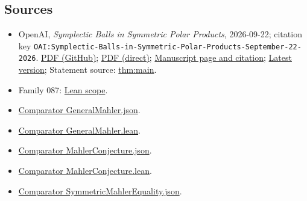 \documentclass[11pt]{article}
\begin{document}
\subsection{Sources}
\begin{itemize}
\item OpenAI, \emph{Symplectic Balls in Symmetric Polar Products}, 2026-09-22; citation key \texttt{OAI:Symplectic-Balls-in-Symmetric-Polar-Products-September-22-2026}. \href{https://github.com/openai/math/blob/adc7f1241b42e322a6451854ab7e4b4c146bf78a/preprints/Symplectic-Balls-in-Symmetric-Polar-Products-September-22-2026/paper.pdf}{PDF (GitHub)}; \href{https://github.com/openai/math/raw/adc7f1241b42e322a6451854ab7e4b4c146bf78a/preprints/Symplectic-Balls-in-Symmetric-Polar-Products-September-22-2026/paper.pdf}{PDF (direct)}; \href{https://github.com/openai/math/blob/adc7f1241b42e322a6451854ab7e4b4c146bf78a/preprints/Symplectic-Balls-in-Symmetric-Polar-Products-September-22-2026/README.md}{Manuscript page and citation}; \href{https://github.com/openai/math/blob/main/preprints/Symplectic-Balls-in-Symmetric-Polar-Products-September-22-2026/paper.pdf}{Latest version}; Statement source: \href{https://github.com/openai/math/blob/adc7f1241b42e322a6451854ab7e4b4c146bf78a/preprints/Symplectic-Balls-in-Symmetric-Polar-Products-September-22-2026/build/sections/introduction.tex\#L22}{thm:main}.
\item Family 087: \href{https://github.com/openai/math/blob/adc7f1241b42e322a6451854ab7e4b4c146bf78a/lean/docs/087.md}{Lean scope}.
\item \href{https://github.com/openai/math/blob/adc7f1241b42e322a6451854ab7e4b4c146bf78a/lean/ComparatorChallenges/GeneralMahler.json}{Comparator GeneralMahler.json}.
\item \href{https://github.com/openai/math/blob/adc7f1241b42e322a6451854ab7e4b4c146bf78a/lean/ComparatorChallenges/GeneralMahler.lean}{Comparator GeneralMahler.lean}.
\item \href{https://github.com/openai/math/blob/adc7f1241b42e322a6451854ab7e4b4c146bf78a/lean/ComparatorChallenges/MahlerConjecture.json}{Comparator MahlerConjecture.json}.
\item \href{https://github.com/openai/math/blob/adc7f1241b42e322a6451854ab7e4b4c146bf78a/lean/ComparatorChallenges/MahlerConjecture.lean}{Comparator MahlerConjecture.lean}.
\item \href{https://github.com/openai/math/blob/adc7f1241b42e322a6451854ab7e4b4c146bf78a/lean/ComparatorChallenges/SymmetricMahlerEquality.json}{Comparator SymmetricMahlerEquality.json}.

\end{itemize}
\end{document}
